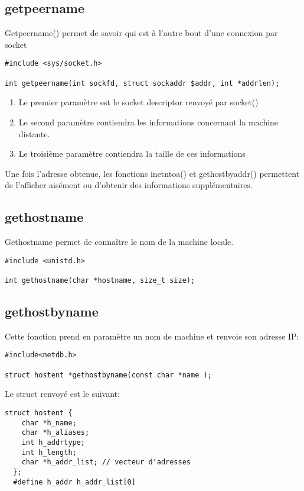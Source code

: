 \documentclass[a4paper]{article}
\begin{document}
\subsection{getpeername}
Getpeername() permet de savoir qui est à l'autre bout d'une connexion par socket
\begin{lstlisting}
#include <sys/socket.h>

int getpeername(int sockfd, struct sockaddr $addr, int *addrlen);
\end{lstlisting}
\begin{enumerate}
  \item Le premier paramètre est le socket descriptor renvoyé par socket()
  \item Le second paramètre contiendra les informations concernant la machine distante.
  \item Le troisième paramètre contiendra la taille de ces informations
\end{enumerate}
Une fois l'adresse obtenue, les fonctions inet\textunderscore{}ntoa() et gethostbyaddr() permettent de l'afficher aisément ou d'obtenir des informations supplémentaires.
\subsection{gethostname}
Gethostname permet de connaître le nom de la machine locale.
\begin{lstlisting}
#include <unistd.h>

int gethostname(char *hostname, size_t size);
\end{lstlisting}
\subsection{gethostbyname}
Cette fonction prend en paramètre un nom de machine et renvoie son adresse IP:
\begin{lstlisting}
#include<netdb.h>

struct hostent *gethostbyname(const char *name );
\end{lstlisting}
Le struct renvoyé est le suivant:
\begin{lstlisting}
struct hostent {
    char *h_name;
    char *h_aliases;
    int h_addrtype;
    int h_length;
    char *h_addr_list; // vecteur d'adresses
  };
  #define h_addr h_addr_list[0]
\end{lstlisting}
\newpage
\end{document}
